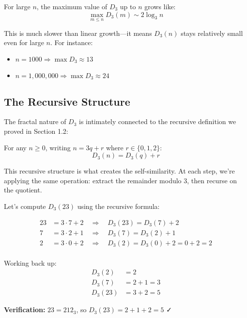 \begin{keyidea}
For large $n$, the maximum value of $D_3$ up to $n$ grows like:
\begin{equation}
\max_{m \leq n} D_3(m) \sim 2 \log_3 n
\end{equation}

This is much slower than linear growth—it means $D_3(n)$ stays relatively small even for large $n$. For instance:
\begin{itemize}
\item $n = 1000 \Rightarrow \max D_3 \approx 13$
\item $n = 1{,}000{,}000 \Rightarrow \max D_3 \approx 24$
\end{itemize}
\end{keyidea}

\subsection{The Recursive Structure}
\label{subsec:recursive-structure}


The fractal nature of $D_3$ is intimately connected to the recursive definition we proved in Section 1.2:

\begin{theorem}
\label{thm:d3-recursive-fractal}
For any $n \geq 0$, writing $n = 3q + r$ where $r \in \{0, 1, 2\}$:
\begin{equation}
D_3(n) = D_3(q) + r
\end{equation}
\end{theorem}

This recursive structure is what creates the self-similarity. At each step, we're applying the same operation: extract the remainder modulo 3, then recurse on the quotient.

\begin{example}
Let's compute $D_3(23)$ using the recursive formula:

\begin{align}
23 &= 3 \cdot 7 + 2 \quad \Rightarrow \quad D_3(23) = D_3(7) + 2 \\
7 &= 3 \cdot 2 + 1 \quad \Rightarrow \quad D_3(7) = D_3(2) + 1 \\
2 &= 3 \cdot 0 + 2 \quad \Rightarrow \quad D_3(2) = D_3(0) + 2 = 0 + 2 = 2 \\
\end{align}

Working back up:
\begin{align}
D_3(2) &= 2 \\
D_3(7) &= 2 + 1 = 3 \\
D_3(23) &= 3 + 2 = 5
\end{align}

\textbf{Verification:} $23 = 212_3$, so $D_3(23) = 2 + 1 + 2 = 5$ ✓
\end{example}


